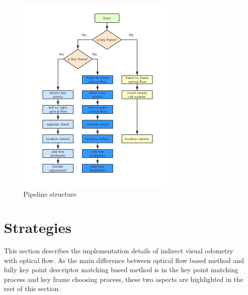 \documentclass{easychair}
\begin{document}
\begin{figure}[h!]
	\centering
	\includegraphics[width=0.7\textwidth]{img/flowchart.png}
	\caption{Pipeline structure}
	\label{fig:pipeline structure}
\end{figure}



\section{Strategies}
This section describes the implementation details of indirect visual odometry with optical flow. As the main difference between optical flow based method and fully key point descriptor matching based method is in the key point matching process and key frame choosing process, these two aspects are highlighted in the rest of this section.

\end{document}
